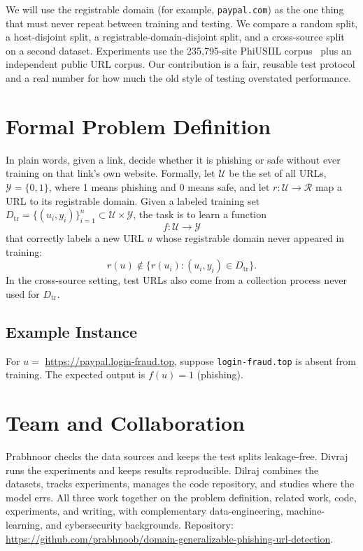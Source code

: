 \documentclass[sigconf,nonacm]{acmart}
\begin{document}
We will use the registrable domain (for example, \texttt{paypal.com}) as the one thing that must never repeat between training and testing. We compare a random split, a host-disjoint split, a registrable-domain-disjoint split, and a cross-source split on a second dataset. Experiments use the 235,795-site PhiUSIIL corpus~\cite{prasad2024} plus an independent public URL corpus. Our contribution is a fair, reusable test protocol and a real number for how much the old style of testing overstated performance.

\section{Formal Problem Definition}
In plain words, given a link, decide whether it is phishing or safe without ever training on that link's own website. Formally, let $\mathcal{U}$ be the set of all URLs, $\mathcal{Y}=\{0,1\}$, where 1 means phishing and 0 means safe, and let $r:\mathcal{U}\rightarrow\mathcal{R}$ map a URL to its registrable domain. Given a labeled training set
$D_{\mathrm{tr}}=\{(u_i,y_i)\}_{i=1}^{n}\subset\mathcal{U}\times\mathcal{Y}$,
the task is to learn a function
\[
 f:\mathcal{U}\rightarrow\mathcal{Y}
\]
that correctly labels a new URL $u$ whose registrable domain never appeared in training:
\[
 r(u)\notin\{r(u_i):(u_i,y_i)\in D_{\mathrm{tr}}\}.
\]
In the cross-source setting, test URLs also come from a collection process never used for $D_{\mathrm{tr}}$.

\subsection{Example Instance}
For $u=$ \url{https://paypal.login-fraud.top}, suppose \texttt{login-fraud.top} is absent from training. The expected output is $f(u)=1$ (phishing).

\section{Team and Collaboration}
Prabhnoor checks the data sources and keeps the test splits leakage-free. Divraj runs the experiments and keeps results reproducible. Dilraj combines the datasets, tracks experiments, manages the code repository, and studies where the model errs. All three work together on the problem definition, related work, code, experiments, and writing, with complementary data-engineering, machine-learning, and cybersecurity backgrounds. Repository: \url{https://github.com/prabhnoob/domain-generalizable-phishing-url-detection}.



\end{document}
